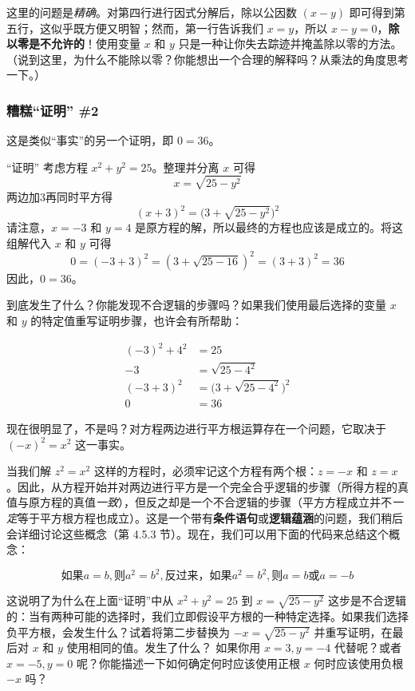 这里的问题是\textit{精确}。对第四行进行因式分解后，除以公因数 $(x - y)$ 即可得到第五行，这似乎既方便又明智；然而，第一行告诉我们 $x = y$，所以 $x-y = 0$，\textbf{除以零是不允许的}！使用变量 $x$ 和 $y$ 只是一种让你失去踪迹并掩盖除以零的方法。（说到这里，为什么不能除以零？你能想出一个合理的解释吗？从乘法的角度思考一下。）

\subsubsection*{糟糕“证明” \#2}

这是类似“事实”的另一个证明，即 $0 = 36$。

\begin{proofs}{“证明”}
    考虑方程 $x^2+y^2 = 25$。整理并分离 $x$ 可得
    \[x = \sqrt{25-y^2}\]
    两边加3再同时平方得
    \[(x+3)^2=\Big(3+\sqrt{25-y^2}\Big)^2\]
    请注意，$x = -3$ 和 $y = 4$ 是原方程的解，所以最终的方程也应该是成立的。将这组解代入 $x$ 和 $y$ 可得
    \[0 = (-3+3)^2 = (3+\sqrt{25-16})^2 = (3+3)^2 = 36\]
    因此，$0 = 36$。
\end{proofs}

到底发生了什么？你能发现不合逻辑的步骤吗？如果我们使用最后选择的变量 $x$ 和 $y$ 的特定值重写证明步骤，也许会有所帮助：

\begin{align*}
    (-3)^2+4^2 &= 25 \\
    -3 &= \sqrt{25-4^2} \\
    (-3+3)^2 &= \Big(3+\sqrt{25-4^2}\Big)^2 \\
    0 &= 36
\end{align*}

现在很明显了，不是吗？对方程两边进行平方根运算存在一个问题，它取决于 $(-x)^2=x^2$ 这一事实。

当我们解 $z^2=x^2$ 这样的方程时，必须牢记这个方程有两个根：$z = -x$ 和 $z = x$。因此，从方程开始并对两边进行平方是一个完全合乎逻辑的步骤（所得方程的真值与原方程的真值\textit{一致}），但反之却是一个不合逻辑的步骤（平方方程成立并不\textit{一定}等于平方根方程也成立）。这是一个带有\textbf{条件语句}或\textbf{逻辑蕴涵}的问题，我们稍后会详细讨论这些概念（第 4.5.3 节）。现在，我们可以用下面的代码来总结这个概念：

\[\text{如果} a=b, \text{则} a^2=b^2, \text{反过来，如果} a^2=b^2, \text{则} a=b \text{或} a=-b\]

这说明了为什么在上面“证明”中从 $x^2+y^2 = 25$ 到 $x = \sqrt{25-y^2}$ 这步是不合逻辑的：当有两种可能的选择时，我们立即假设平方根的一种特定选择。如果我们选择负平方根，会发生什么？试着将第二步替换为 $-x = \sqrt{25-y^2}$ 并重写证明，在最后对 $x$ 和 $y$ 使用相同的值。发生了什么？ 如果你用 $x = 3, y = -4$ 代替呢？或者 $x=-5, y=0$ 呢？你能描述一下如何确定何时应该使用正根 $x$ 何时应该使用负根 $-x$ 吗？

